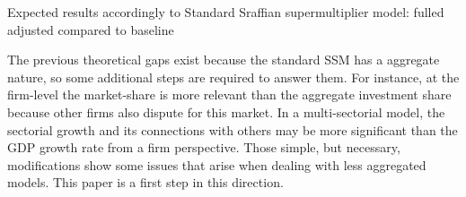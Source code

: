\documentclass{SelfArx}
\begin{document}
\begin{table*}\centering
\caption{Expected results accordingly to Standard Sraffian supermultiplier model: fulled adjusted compared to baseline}
\label{Tab_exp_resul_long:ch_super}
\caption*{\textbf{Source:} Authors' elaboration}
\end{table*}



The previous theoretical gaps exist because the standard SSM has a aggregate nature, so some additional steps are required to answer them.
For instance, at the firm-level the market-share is more relevant than the aggregate investment share because other firms also dispute for this market.
In a multi-sectorial model, the sectorial growth and its connections with others may be more significant than the GDP growth rate from a firm perspective.
Those simple, but necessary, modifications show some issues that arise when dealing with less aggregated models.
This paper is a first step in this direction.
\end{document}
